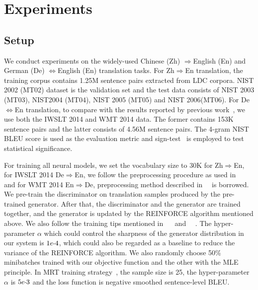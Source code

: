 \documentclass[letterpaper]{article} \usepackage{aaai19}  \usepackage{times}  \usepackage{helvet}  \usepackage{courier}  \usepackage{url}  \usepackage{graphicx}  \frenchspacing  \setlength{\pdfpagewidth}{8.5in}  \setlength{\pdfpageheight}{11in}  \usepackage{amsmath}
\begin{document}
\section{Experiments}

\subsection{Setup}

We conduct experiments on the widely-used Chinese (Zh) $\Rightarrow$English (En) and German (De) $\Leftrightarrow$English (En) translation tasks. For Zh$\Rightarrow$En translation, the training corpus contains 1.25M sentence pairs extracted from LDC corpora. NIST 2002 (MT02) dataset is the validation set and the test data consists of NIST 2003 (MT03), NIST2004 (MT04), NIST 2005 (MT05) and NIST 2006(MT06). 
For De$\Leftrightarrow$En translation, to compare with the results reported by previous work~\cite{Shen:2016:ACL,bahdanau2016actor,wu2017adversarial,vaswani2017attention}, we use both the IWSLT 2014 and WMT 2014 data. The former contains 153K sentence pairs and the latter consists of 4.56M sentence pairs.
The 4-gram NIST BLEU score \cite{papineni2002bleu} is used as the evaluation metric and sign-test~\cite{collins2005clause} is employed to test statistical significance. 




For training all neural models, we set the vocabulary size to 30K for Zh$\Rightarrow$En, for IWSLT 2014 De$\Rightarrow$En, we follow the preprocessing procedure as used in ~\citeauthor{Ranzato:2016:ICLR}~ and for WMT 2014 En$\Rightarrow$De, preprocessing method described in~\citeauthor{vaswani2017attention}~ is borrowed. We pre-train the discriminator on translation samples produced by the pre-trained generator. After that, the discriminator and the generator are trained together, and the generator is updated by the REINFORCE algorithm mentioned above. We also follow the training tips  mentioned in ~\citeauthor{Shen:2016:ACL}~ and ~\citeauthor{wu2017adversarial}~. The hyper-parameter $\alpha$ which could control the sharpness of the generator distribution in our system is $1e\scalebox{0.75}[1.0]{-}4$, which could also be regarded as a baseline to reduce the variance of the REINFORCE algorithm. We also randomly choose 50\% minibatches trained with our objective function and the other with the MLE principle.
In MRT training strategy~\cite{Shen:2016:ACL}, the sample size is 25, the hyper-parameter $\alpha$ is $5e\scalebox{0.75}[1.0]{-}3$ and the loss function is negative smoothed sentence-level BLEU.
\end{document}
